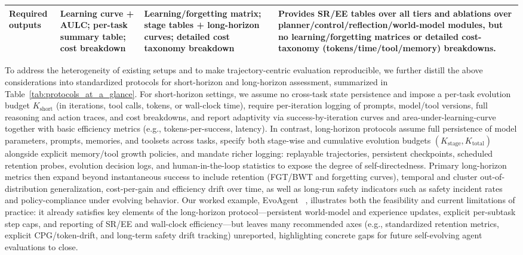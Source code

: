\documentclass[10pt]{article} %
\begin{document}
\begin{table}[t!]
{\begin{tabular}{m{3.4cm}m{6.0cm}m{6.0cm}m{7.8cm}}
\cellcolor[rgb]{0.96,0.96,0.96}\textbf{Required outputs} 
& \cellcolor[rgb]{0.96,0.96,0.96}Learning curve + AULC; per-task summary table; cost breakdown 
& \cellcolor[rgb]{0.96,0.96,0.96}Learning/forgetting matrix; stage tables + long-horizon curves; detailed cost taxonomy breakdown 
& \cellcolor[rgb]{0.96,0.96,0.96}Provides SR/EE tables over all tiers and ablations over planner/control/reflection/world-model modules, but no learning/forgetting matrices or detailed cost-taxonomy (tokens/time/tool/memory) breakdowns. \\
\bottomrule
\end{tabular}}
\end{table}

To address the heterogeneity of existing setups and to make trajectory-centric evaluation reproducible, we further distill the above considerations into standardized protocols for short-horizon and long-horizon assessment, summarized in Table~\ref{tab:protocols_at_a_glance}. For short-horizon settings, we assume no cross-task state persistence and impose a per-task evolution budget $K_{\text{short}}$ (in iterations, tool calls, tokens, or wall-clock time), require per-iteration logging of prompts, model/tool versions, full reasoning and action traces, and cost breakdowns, and report adaptivity via success-by-iteration curves and area-under-learning-curve together with basic efficiency metrics (e.g., tokens-per-success, latency). In contrast, long-horizon protocols assume full persistence of model parameters, prompts, memories, and toolsets across tasks, specify both stage-wise and cumulative evolution budgets $(K_{\text{stage}}, K_{\text{total}})$ alongside explicit memory/tool growth policies, and mandate richer logging: replayable trajectories, persistent checkpoints, scheduled retention probes, evolution decision logs, and human-in-the-loop statistics to expose the degree of self-directedness. Primary long-horizon metrics then expand beyond instantaneous success to include retention (FGT/BWT and forgetting curves), temporal and cluster out-of-distribution generalization, cost-per-gain and efficiency drift over time, as well as long-run safety indicators such as safety incident rates and policy-compliance under evolving behavior. Our worked example, EvoAgent ~\citep{yuan2025evoagentautomaticmultiagentgeneration}, illustrates both the feasibility and current limitations of practice: it already satisfies key elements of the long-horizon protocol—persistent world-model and experience updates, explicit per-subtask step caps, and reporting of SR/EE and wall-clock efficiency—but leaves many recommended axes (e.g., standardized retention metrics, explicit CPG/token-drift, and long-term safety drift tracking) unreported, highlighting concrete gaps for future self-evolving agent evaluations to close.
\end{document}
